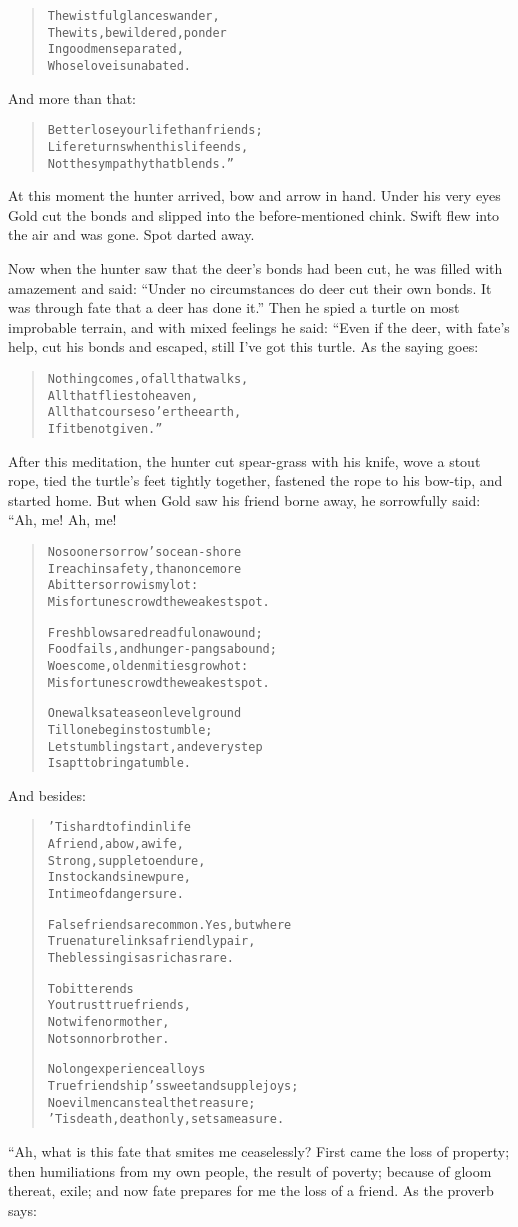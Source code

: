 \documentclass[article, twoside, 14pt]{memoir}
\renewenvironment{verbatim}{%
\begin{quote}%
\vskip -10pt%
\begin{alltt}\normalfont\large}{\end{alltt}%
\end{quote}%
\vskip -10pt
} %
\begin{document}
\begin{verbatim}
The wistful glances wander,
The wits, bewildered, ponder
In good men separated,
Whose love is unabated.
\end{verbatim}
And more than that:

\begin{verbatim}
Better lose your life than friends;
Life returns when this life ends,
Not the sympathy that blends.”
\end{verbatim}
At this moment the hunter arrived, bow and arrow in hand.
Under his very eyes Gold cut the bonds and slipped into the
before-mentioned chink. Swift flew into the air and was gone. Spot
darted away.

Now when the hunter saw that the deer's bonds had been cut, he was
filled with amazement and said:
``Under no circumstances do deer cut their own bonds. It was through fate that a deer has done it.''
Then he spied a turtle on most improbable terrain, and with mixed
feelings he said: “Even if the deer, with fate's help, cut his
bonds and escaped, still I've got this turtle. As the saying goes:

\begin{verbatim}
Nothing comes, of all that walks,
    All that flies to heaven,
All that courses o'er the earth,
    If it be not given.”
\end{verbatim}
After this meditation, the hunter cut spear-grass with his knife,
wove a stout rope, tied the turtle's feet tightly together,
fastened the rope to his bow-tip, and started home. But when Gold
saw his friend borne away, he sorrowfully said: “Ah, me! Ah, me!

\begin{verbatim}
No sooner sorrow's ocean-shore
I reach in safety, than once more
A bitter sorrow is my lot:
Misfortunes crowd the weakest spot.

Fresh blows are dreadful on a wound;
Food fails, and hunger-pangs abound;
Woes come, old enmities grow hot:
Misfortunes crowd the weakest spot.

One walks at ease on level ground
    Till one begins to stumble;
Let stumbling start, and every step
    Is apt to bring a tumble.
\end{verbatim}
And besides:

\begin{verbatim}
'Tis hard to find in life
A friend, a bow, a wife,
Strong, supple to endure,
In stock and sinew pure,
In time of danger sure.

False friends are common. Yes, but where
True nature links a friendly pair,
The blessing is as rich as rare.

To bitter ends
You trust true friends,
Not wife nor mother,
Not son nor brother.

No long experience alloys
True friendship's sweet and supple joys;
No evil men can steal the treasure;
'Tis death, death only, sets a measure.
\end{verbatim}
“Ah, what is this fate that smites me ceaselessly? First came the
loss of property; then humiliations from my own people, the result
of poverty; because of gloom thereat, exile; and now fate prepares
for me the loss of a friend. As the proverb says:
\end{document}
